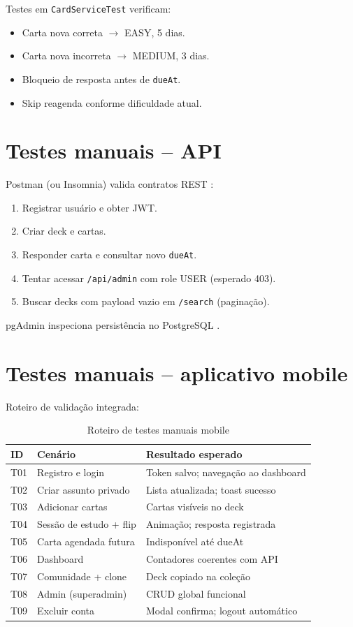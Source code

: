 Testes em \texttt{CardServiceTest} verificam:
\begin{itemize}
    \item Carta nova correta $\rightarrow$ EASY, 5 dias.
    \item Carta nova incorreta $\rightarrow$ MEDIUM, 3 dias.
    \item Bloqueio de resposta antes de \texttt{dueAt}.
    \item Skip reagenda conforme dificuldade atual.
\end{itemize}

\section{Testes manuais -- API}

Postman (ou Insomnia) valida contratos REST \cite{postman_docs}:

\begin{enumerate}
    \item Registrar usuário e obter JWT.
    \item Criar deck e cartas.
    \item Responder carta e consultar novo \texttt{dueAt}.
    \item Tentar acessar \texttt{/api/admin} com role USER (esperado 403).
    \item Buscar decks com payload vazio em \texttt{/search} (paginação).
\end{enumerate}

pgAdmin inspeciona persistência no PostgreSQL \cite{pgadmin_docs}.

\section{Testes manuais -- aplicativo mobile}

Roteiro de validação integrada:

\begin{longtable}{p{1cm} p{5cm} p{7.5cm}}
    \caption{Roteiro de testes manuais mobile} \label{tab:testes-mobile} \\
    \toprule
    \textbf{ID} & \textbf{Cenário} & \textbf{Resultado esperado} \\
    \midrule
    \endfirsthead
    T01 & Registro e login & Token salvo; navegação ao dashboard \\
    T02 & Criar assunto privado & Lista atualizada; toast sucesso \\
    T03 & Adicionar cartas & Cartas visíveis no deck \\
    T04 & Sessão de estudo + flip & Animação; resposta registrada \\
    T05 & Carta agendada futura & Indisponível até dueAt \\
    T06 & Dashboard & Contadores coerentes com API \\
    T07 & Comunidade + clone & Deck copiado na coleção \\
    T08 & Admin (superadmin) & CRUD global funcional \\
    T09 & Excluir conta & Modal confirma; logout automático \\
    \bottomrule
\end{longtable}

